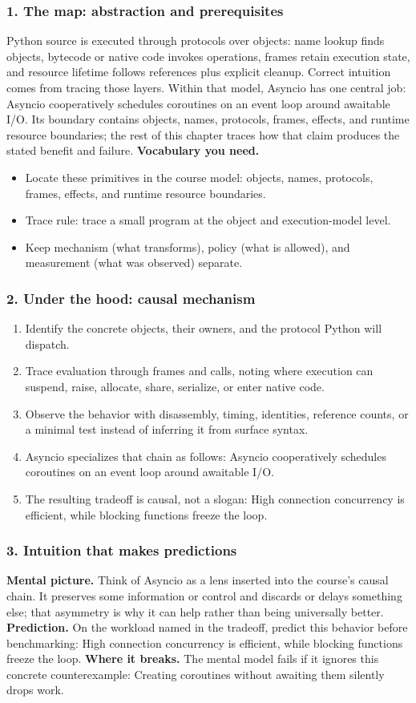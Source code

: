 \subsubsection*{1. The map: abstraction and prerequisites}
Python source is executed through protocols over objects: name lookup finds objects, bytecode or native code invokes operations, frames retain execution state, and resource lifetime follows references plus explicit cleanup. Correct intuition comes from tracing those layers.
Within that model, Asyncio has one central job: Asyncio cooperatively schedules coroutines on an event loop around awaitable I/O. Its boundary contains objects, names, protocols, frames, effects, and runtime resource boundaries; the rest of this chapter traces how that claim produces the stated benefit and failure.
\textbf{Vocabulary you need.}\begin{itemize}
\item Locate these primitives in the course model: objects, names, protocols, frames, effects, and runtime resource boundaries.
\item Trace rule: trace a small program at the object and execution-model level.
\item Keep mechanism (what transforms), policy (what is allowed), and measurement (what was observed) separate.
\end{itemize}
\subsubsection*{2. Under the hood: causal mechanism}\begin{enumerate}
\item Identify the concrete objects, their owners, and the protocol Python will dispatch.
\item Trace evaluation through frames and calls, noting where execution can suspend, raise, allocate, share, serialize, or enter native code.
\item Observe the behavior with disassembly, timing, identities, reference counts, or a minimal test instead of inferring it from surface syntax.
\item Asyncio specializes that chain as follows: Asyncio cooperatively schedules coroutines on an event loop around awaitable I/O.
\item The resulting tradeoff is causal, not a slogan: High connection concurrency is efficient, while blocking functions freeze the loop.
\end{enumerate}
\subsubsection*{3. Intuition that makes predictions}
\textbf{Mental picture.} Think of Asyncio as a lens inserted into the course's causal chain. It preserves some information or control and discards or delays something else; that asymmetry is why it can help rather than being universally better.
\textbf{Prediction.} On the workload named in the tradeoff, predict this behavior before benchmarking: High connection concurrency is efficient, while blocking functions freeze the loop.
\textbf{Where it breaks.} The mental model fails if it ignores this concrete counterexample: Creating coroutines without awaiting them silently drops work.
